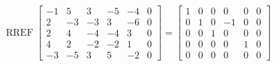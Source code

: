 \begin{exerciseAnswer} 


\[\operatorname{RREF} \left[\begin{array}{ccccc|c}
-1 & 5 & 3 & -5 & -4 & 0 \\
2 & -3 & -3 & 3 & -6 & 0 \\
2 & 4 & -4 & -4 & 3 & 0 \\
4 & 2 & -2 & -2 & 1 & 0 \\
-3 & -5 & 3 & 5 & -2 & 0
\end{array}\right] = \left[\begin{array}{ccccc|c}
1 & 0 & 0 & 0 & 0 & 0 \\
0 & 1 & 0 & -1 & 0 & 0 \\
0 & 0 & 1 & 0 & 0 & 0 \\
0 & 0 & 0 & 0 & 1 & 0 \\
0 & 0 & 0 & 0 & 0 & 0
\end{array}\right] \]



\end{exerciseAnswer}
